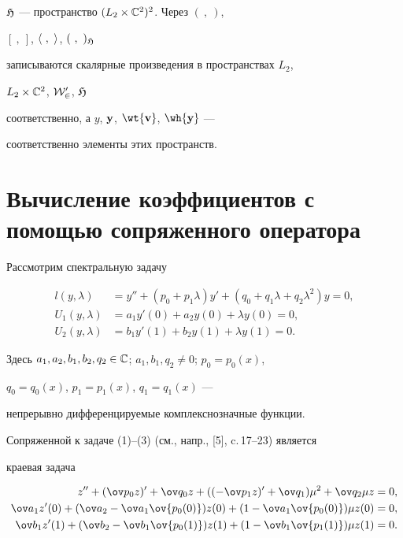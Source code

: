 $\frak H$ --- пространство $(L_2\times\Bbb C^2)^2$. Через $(\ ,\ )$, 


$[\ ,\ ]$, $\langle\ ,\ \rangle$, $(\ ,\ )_{\frak H}$ 


записываются скалярные произведения в пространствах $L_2$, 


$L_2\times\Bbb C^2$, $\cal W^0_2$, $\frak H$ 


соответственно, а $y$, $\bold y$, $\wt{\bold v}$, $\wh{\bold y}$ --- 


соответственно элементы этих пространств.


 


\section{Вычисление коэффициентов с помощью сопряженного оператора} 


 


Рассмотрим спектральную задачу  


\begin{align} 


l(y,\lambda)&=y''+(p_0+p_1\lambda)y'+ 


(q_0+q_1\lambda+q_2\lambda^2)y=0,\\ 


% 


U_1(y,\lambda)&=a_1y'(0)+a_2y(0)+\lambda y(0)=0, \\ 


% 


U_2(y,\lambda)&=b_1y'(1)+b_2y(1)+\lambda y(1)=0. 


\end{align} 


Здесь $a_1,a_2,b_1,b_2,q_2\in\Bbb C$; $a_1,b_1,q_2\ne0$; $p_0=p_0(x)$, 


$q_0=q_0(x)$, $p_1=p_1(x)$, $q_1=q_1(x)$ --- 


непрерывно дифференцируемые комплекснозначные функции.  


 


Сопряженной к задаче (1)--(3) (см., напр., [5], c.\,17--23) является  


краевая задача 


\begin{align*} 


z''+(\ov p_0z)'+\ov q_0z+((-\ov p_1z)'+\ov q_1)\mu^2+ 


\ov q_2\mu z&=0,\\ 


% 


\ov a_1z'(0)+(\ov a_2-\ov a_1\ov{p_0(0)})z(0)+ 


(1-\ov a_1\ov{p_0(0)})\mu z(0)&=0,\\ 


% 


\ov b_1z'(1)+(\ov b_2-\ov b_1\ov{p_0(1)})z(1)+ 


(1-\ov b_1\ov{p_1(1)})\mu z(1)&=0. 


\end{align*} 


